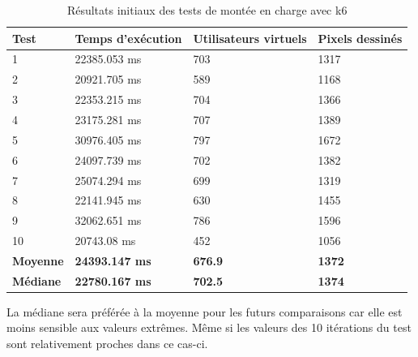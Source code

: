 \begin{table}[H]
  \centering
  \begin{tabular}{|l|l|l|l|}
    \hline
    \textbf{Test}    & \textbf{Temps d'exécution} & \textbf{Utilisateurs virtuels} & \textbf{Pixels dessinés} \\ \hline
    1                & 22385.053 ms               & 703                            & 1317                     \\ \hline
    2                & 20921.705 ms               & 589                            & 1168                     \\ \hline
    3                & 22353.215 ms               & 704                            & 1366                     \\ \hline
    4                & 23175.281 ms               & 707                            & 1389                     \\ \hline
    5                & 30976.405 ms               & 797                            & 1672                     \\ \hline
    6                & 24097.739 ms               & 702                            & 1382                     \\ \hline
    7                & 25074.294 ms               & 699                            & 1319                     \\ \hline
    8                & 22141.945 ms               & 630                            & 1455                     \\ \hline
    9                & 32062.651 ms               & 786                            & 1596                     \\ \hline
    10               & 20743.08 ms                & 452                            & 1056                     \\ \hline
    \textbf{Moyenne} & \textbf{24393.147 ms}      & \textbf{676.9}                 & \textbf{1372}            \\ \hline
    \textbf{Médiane} & \textbf{22780.167 ms}      & \textbf{702.5}                 & \textbf{1374}            \\ \hline
  \end{tabular}
  \caption{Résultats initiaux des tests de montée en charge avec k6}
  \label{table:k6-initial-results}
\end{table}

La médiane sera préférée à la moyenne pour les futurs comparaisons car elle est moins sensible aux valeurs extrêmes. Même si les valeurs des 10 itérations du test sont relativement proches dans ce cas-ci.

